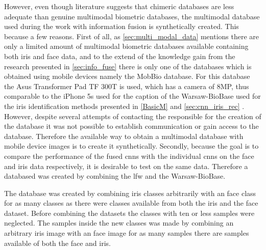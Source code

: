 However, even though literature suggests that chimeric databases are less adequate than genuine multimodal biometric databases, the multimodal database used during the work with information fusion is synthetically created. This because a few reasons. First of all, as \autoref{sec:multi_modal_data} mentions there are only a limited amount of multimodal biometric databases available containing both iris and face data, and to the extend of the knowledge gain from the research presented in \autoref{sec:info_fuse} there is only one of the databases which is obtained using mobile devices namely the MobBio database. For this database the Asus Transformer Pad TF 300T is used, which has a camera of 8MP, thus comparable to the iPhone 5s used for the caption of the Warsaw-BioBase used for the iris identification methods presented in \autoref{BasicM} and \autoref{sec:cnn_iris_rec} \citep{Sequeira2014}. However, despite several attempts of contacting the responsible for the creation of the database it was not possible to establish communication or gain access to the database. Therefore the available way to obtain a multimodal database with mobile device images is to create it synthetically. Secondly, because the goal is to compare the performance of the fused \gls{cnn}s with the individual \gls{cnn}s on the face and iris data respectively, it is desirable to test on the same data. Therefore a databased was created by combining the \gls{lfw} and the Warsaw-BioBase. 

The database was created by combining iris classes arbitrarily with an face class for as many classes as there were classes available from both the iris and the face dataset. Before combining the datasets the classes with ten or less samples were neglected. The samples inside the new classes was made by combining an arbitrary iris image with an face image for as many samples there are samples available of both the face and iris. 


